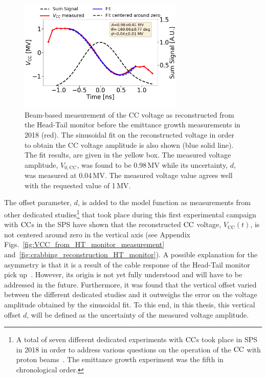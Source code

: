 \begin{figure}[!h]
   \centering         
   \includegraphics[width=0.7\textwidth]{images/Ch5/HT_VCC_callibration_20180905_135033_sin_fit_fixed_freq_thesis_different_parameters.png}
       \caption{Beam-based measurement of the CC voltage as reconstructed from the Head-Tail monitor before the emittance growth measurements in 2018 (red). The sinusoidal fit on the reconstructed voltage in order to obtain the CC voltage amplitude is also shown (blue solid line). The fit results, are given in the yellow box. The measured voltage amplitude, $V_\mathrm{0, CC}$, was found to be 0.98\,MV while its uncertainty, $d$, was measured at 0.04\,MV. The measured voltage value agrees well with the requested value of 1\,MV.}
       \label{fig:crabbing_sin_fit_MD5}
\end{figure}


The offset parameter, $d$, is added to the model function as measurements from other dedicated studies\footnote{A total of seven different dedicated experiments with ${\mathrm{CC}}$s took place in SPS in 2018 in order to address various questions on the operation of the ${\mathrm{CC}}$ with proton beams~\cite{BE_seminar}. The emittance growth experiment was the fifth in chronological order.} that took place during this first experimental campaign with ${\mathrm{CC}}$s in the SPS have shown that the reconstructed ${\mathrm{CC}}$ voltage, $V_\mathrm{CC}(t)$, is not centered around zero in the vertical axis (see Appendix Figs.~\ref{fig:VCC_from_HT_monitor_measurement} and~\ref{fig:crabbing_reconstruction_HT_monitor}). A possible explanation for the asymmetry is that it is a result of the cable response of the Head-Tail monitor pick up~\cite{Levens_WP2_HT_CC_diagnostic}. However, its origin is not yet fully understood and will have to be addressed in the future. Furthermore, it was found that the vertical offset varied between the different dedicated studies and it outweighs the error on the voltage amplitude obtained by the sinusoidal fit. To this end, in this thesis, this vertical offset $d$, will be defined as the uncertainty of the measured voltage amplitude. 

